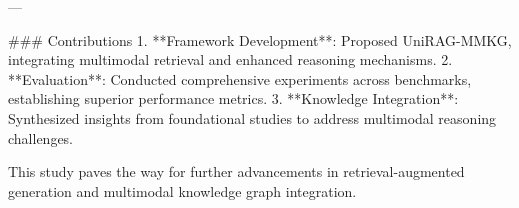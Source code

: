---

### Contributions  
1. **Framework Development**: Proposed UniRAG-MMKG, integrating multimodal retrieval and enhanced reasoning mechanisms.  
2. **Evaluation**: Conducted comprehensive experiments across benchmarks, establishing superior performance metrics.  
3. **Knowledge Integration**: Synthesized insights from foundational studies to address multimodal reasoning challenges.

This study paves the way for further advancements in retrieval-augmented generation and multimodal knowledge graph integration.